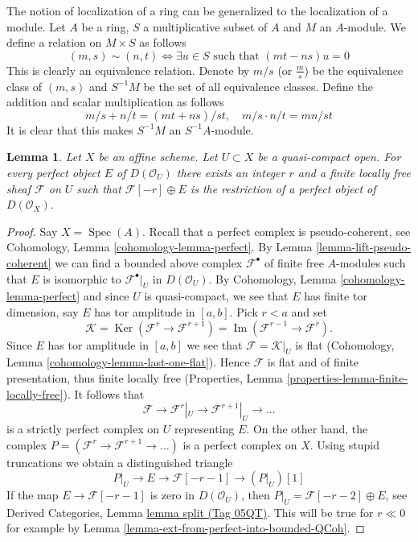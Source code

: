 \documentclass{amsart}
\theoremstyle{plain}
\newtheorem{lemma}[subsection]{Lemma}
\theoremstyle{definition}
\theoremstyle{remark}
\numberwithin{equation}{subsection}
\def\Spec{\mathop{\mathrm{Spec}}}
\def\Ker{\mathop{\mathrm{Ker}}}
\def\Im{\mathop{\mathrm{Im}}}
\begin{document}
\noindent
The notion of localization of a ring can be generalized to the
localization of a module. Let $A$ be a ring, $S$ a multiplicative
subset of $A$ and $M$ an $A$-module. We define a relation on
$M \times S$ as follows
$$
(m, s) \sim (n, t)
\Leftrightarrow
\exists u\in S \text{ such that } (mt-ns)u = 0
$$
This is clearly an equivalence relation. Denote by $m/s$ (or
$\frac{m}{s}$) be the equivalence class of $(m, s)$ and $S^{-1}M$ be
the set of all equivalence classes. Define the addition and scalar
multiplication as follows
$$
m/s + n/t = (mt + ns)/st,\quad
m/s\cdot n/t = mn/st
$$
It is clear that this makes $S^{-1}M$ an $S^{-1}A$-module.


\begin{lemma}
\label{lemma-lift-perfect-complex-plus-locally-free}
Let $X$ be an affine scheme. Let $U \subset X$ be a quasi-compact open.
For every perfect object $E$ of $D(\mathcal{O}_U)$ there exists an integer
$r$ and a finite locally free sheaf $\mathcal{F}$ on $U$ such that
$\mathcal{F}[-r] \oplus E$ is the restriction of a perfect object of
$D(\mathcal{O}_X)$.
\end{lemma}

\begin{proof}
Say $X = \Spec(A)$. Recall that a perfect complex is
pseudo-coherent, see
Cohomology, Lemma \ref{cohomology-lemma-perfect}.
By Lemma \ref{lemma-lift-pseudo-coherent} we can find a bounded above complex
$\mathcal{F}^\bullet$ of finite free $A$-modules such that $E$ is
isomorphic to $\mathcal{F}^\bullet|_U$ in $D(\mathcal{O}_U)$.
By Cohomology, Lemma \ref{cohomology-lemma-perfect} and since
$U$ is quasi-compact, we see that $E$ has finite tor dimension, say
$E$ has tor amplitude in $[a, b]$. Pick $r < a$ and set
$$
\mathcal{K} = \Ker(\mathcal{F}^{r} \to \mathcal{F}^{r + 1})
= \Im(\mathcal{F}^{r - 1} \to \mathcal{F}^r).
$$
Since $E$ has tor amplitude in $[a, b]$ we see that
$\mathcal{F} = \mathcal{K}|_U$ is
flat (Cohomology, Lemma \ref{cohomology-lemma-last-one-flat}).
Hence $\mathcal{F}$ is flat and of finite presentation, thus finite
locally free (Properties, Lemma \ref{properties-lemma-finite-locally-free}).
It follows that
$$
\mathcal{F} \to \mathcal{F}^r|_U \to \mathcal{F}^{r + 1}|_U \to \ldots
$$
is a strictly perfect complex on $U$ representing $E$. On the other hand,
the complex $P = (\mathcal{F}^r \to \mathcal{F}^{r + 1} \to \ldots )$
is a perfect complex on $X$. Using
stupid truncations we obtain a distinguished triangle
$$
P|_U \to E \to \mathcal{F}[-r - 1] \to (P|_U)[1]
$$
If the map $E \to \mathcal{F}[-r - 1]$ is zero in $D(\mathcal{O}_U)$,
then $P|_U = \mathcal{F}[-r - 2] \oplus E$, see
Derived Categories, Lemma \href{https://stacks.math.columbia.edu/tag/05QT}{lemma split (Tag 05QT)}.
This will be true for $r \ll 0$ for example by
Lemma \ref{lemma-ext-from-perfect-into-bounded-QCoh}.
\end{proof}
\end{document}
